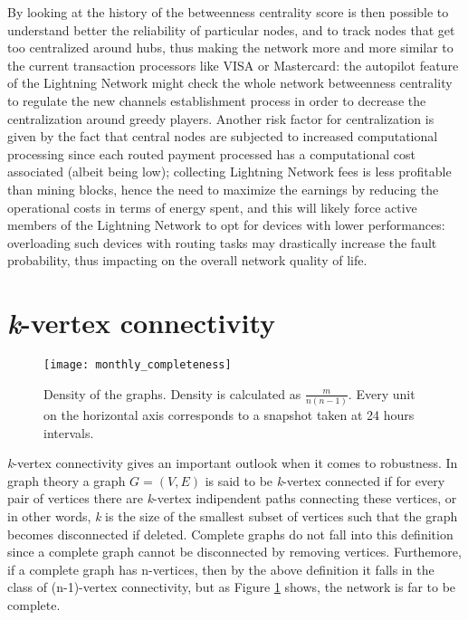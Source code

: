 	By looking at the history of the betweenness centrality score is then possible to understand better the reliability of particular nodes, and to track nodes that get too centralized around hubs, thus making the network more and more similar to the current transaction processors like VISA or Mastercard: the autopilot feature of the Lightning Network might check the whole network betweenness centrality to regulate the new channels establishment process in order to decrease the centralization around greedy players. Another risk factor for centralization is given by the fact that central nodes are subjected to increased computational processing since each routed payment processed has a computational cost associated (albeit being low); collecting Lightning Network fees is less profitable than mining blocks, hence the need to maximize the earnings by reducing the operational costs in terms of energy spent, and this will likely force active members of the Lightning Network to opt for devices with lower performances: overloading such devices with routing tasks may drastically increase the fault probability, thus impacting on the overall network quality of life.
	
	\section{\textit{k}-vertex connectivity}

	\begin{figure}
		\centering
		\texttt{[image: monthly\_completeness]}
		\caption{Density of the graphs. Density is calculated as $\frac{m}{n(n-1)}$. Every unit on the horizontal axis corresponds to a snapshot taken at 24 hours intervals.}
		\label{monthly_completeness}
	\end{figure}
	
	\textit{k}-vertex connectivity gives an important outlook when it comes to robustness. In graph theory a graph $G = (V,E)$ is said to be \textit{k}-vertex connected if for every pair of vertices there are \textit{k}-vertex indipendent paths connecting these vertices, or in other words, \textit{k} is the size of the smallest subset of vertices such that the graph becomes disconnected if deleted. Complete graphs do not fall into this definition since a complete graph cannot be disconnected by removing vertices. Furthemore, if a complete graph has n-vertices, then by the above definition it falls in the class of (n-1)-vertex connectivity, but as Figure \ref{monthly_completeness} shows, the network is far to be complete.

